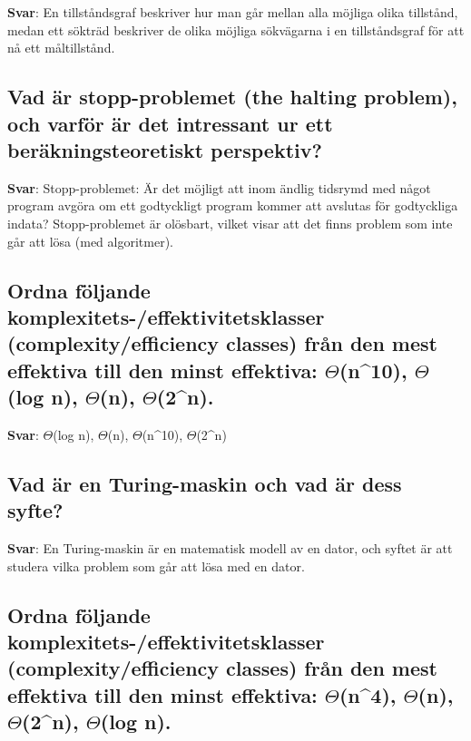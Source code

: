\documentclass[a4paper,11pt,oneside]{article}
\begin{document}
\begin{sloppypar}
\textbf{Svar}: En tillst\r{a}ndsgraf beskriver hur man g\r{a}r mellan alla m\"ojliga olika tillst\r{a}nd, medan ett s\"oktr\"ad beskriver de olika m\"ojliga s\"okv\"agarna i en tillst\r{a}ndsgraf f\"or att n\r{a} ett m\r{a}ltillst\r{a}nd.



\subsection{Vad \"ar stopp-problemet (the halting problem), och varf\"or \"ar det intressant ur ett ber\"akningsteoretiskt perspektiv?}

\label{q:331:sa:sv:True}

\textbf{Svar}: Stopp-problemet: \"Ar det m\"ojligt att inom \"andlig tidsrymd med n\r{a}got program avg\"ora om ett godtyckligt program kommer att avslutas f\"or godtyckliga indata? Stopp-problemet \"ar ol\"osbart, vilket visar att det finns problem som inte g\r{a}r att l\"osa (med algoritmer).



\subsection{Ordna f\"oljande komplexitets-/effektivitetsklasser (complexity/efficiency classes) fr\r{a}n den mest effektiva till den minst effektiva: \ensuremath{\Theta}(n^10), \ensuremath{\Theta}(log n), \ensuremath{\Theta}(n), \ensuremath{\Theta}(2^n).}

\label{q:332:sa:sv:True}

\textbf{Svar}: \ensuremath{\Theta}(log n), \ensuremath{\Theta}(n), \ensuremath{\Theta}(n^10), \ensuremath{\Theta}(2^n)



\subsection{Vad \"ar en Turing-maskin och vad \"ar dess syfte?}

\label{q:333:sa:sv:True}

\textbf{Svar}: En Turing-maskin \"ar en matematisk modell av en dator, och syftet \"ar att studera vilka problem som g\r{a}r att l\"osa med en dator.



\subsection{Ordna f\"oljande komplexitets-/effektivitetsklasser (complexity/efficiency classes) fr\r{a}n den mest effektiva till den minst effektiva: \ensuremath{\Theta}(n^4), \ensuremath{\Theta}(n), \ensuremath{\Theta}(2^n), \ensuremath{\Theta}(log n).}


\end{sloppypar}
\end{document}
